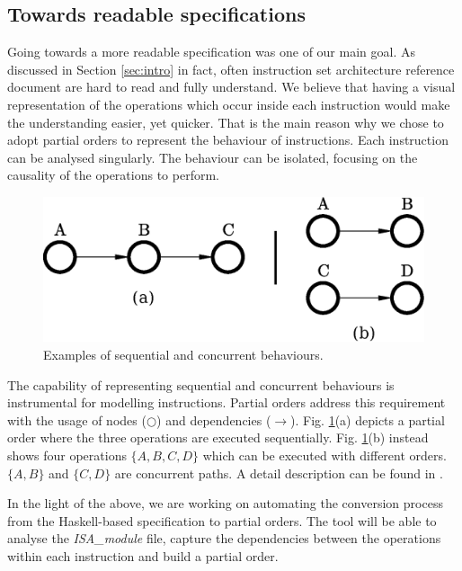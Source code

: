 \documentclass[conference]{IEEEtran}
\begin{document}
\subsection{Towards readable specifications}
\label{sec:read}
Going towards a more readable specification was one of our main goal. As discussed in Section
\ref{sec:intro} in fact, often instruction set architecture reference document are hard to
read and fully understand. We believe that having a visual representation of the operations
which occur inside each instruction would make the understanding easier, yet quicker. That is
the main reason why we chose to adopt partial orders to represent the behaviour of
instructions. Each instruction can be analysed singularly. The behaviour can be isolated,
focusing on the causality of the operations to perform.

\begin{figure}[ht!]
\begin{center}
	\includegraphics[scale=0.5]{IMG/pos.eps}
	\caption{Examples of sequential and concurrent behaviours.}
	\label{fig:pos}
\end{center}
\end{figure}

The capability of representing sequential and concurrent behaviours is instrumental for
modelling instructions. Partial orders address this requirement with the usage of nodes
($\bigcirc$) and dependencies ($\rightarrow$). Fig. \ref{fig:pos}(a) depicts a partial order
where the three operations are executed sequentially. Fig. \ref{fig:pos}(b) instead shows
four operations $\lbrace A,B,C,D \rbrace$ which can be executed with different orders. 
$\lbrace A,B \rbrace$ and $\lbrace C,D \rbrace$ are concurrent paths. A detail
description can be found in \cite{andreyPhd}.

In the light of the above, we are working on automating the conversion process from the
Haskell-based specification to partial orders. The tool will be able to analyse the
\textit{ISA\_module} file, capture the dependencies between the operations within each
instruction and build a partial order. 
\end{document}
